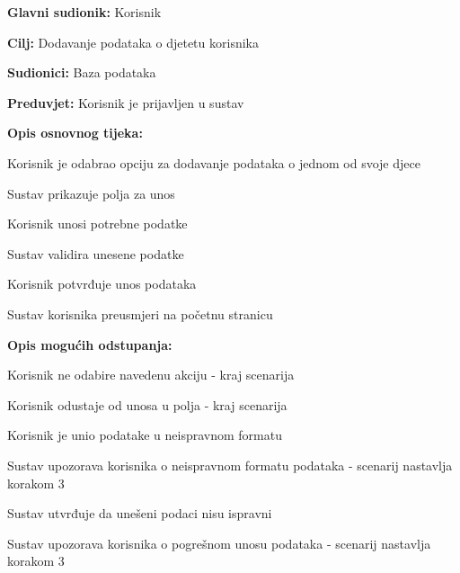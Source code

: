 					\eject

					\noindent {}
					\begin{packed_item}
	
						\item \textbf{Glavni sudionik: }Korisnik
						\item  \textbf{Cilj:} Dodavanje podataka o djetetu korisnika
						\item  \textbf{Sudionici:} Baza podataka
						\item  \textbf{Preduvjet:} Korisnik je prijavljen u sustav
						\item  \textbf{Opis osnovnog tijeka:}
						
						\item[] \begin{packed_enum}
							\item Korisnik je odabrao opciju za dodavanje podataka o jednom od svoje djece
							\item Sustav prikazuje polja za unos
							\item Korisnik unosi potrebne podatke
							\item Sustav validira unesene podatke
							\item Korisnik potvrđuje unos podataka
							\item Sustav korisnika preusmjeri na početnu stranicu
						\end{packed_enum}

						\item  \textbf{Opis mogućih odstupanja:}

						\item[] \begin{packed_item}
							\item[1.a] Korisnik ne odabire navedenu akciju - kraj scenarija
							\item[3.a] Korisnik odustaje od unosa u polja - kraj scenarija
							\item[4.a] Korisnik je unio podatake u neispravnom formatu
							\item[] \begin{packed_enum}
								\item Sustav upozorava korisnika o neispravnom formatu podataka - scenarij nastavlja korakom 3 
							\end{packed_enum}	
							\item[6.a] Sustav utvrđuje da unešeni podaci nisu ispravni
							\item[] \begin{packed_enum}
								\item Sustav upozorava korisnika o pogrešnom unosu podataka - scenarij nastavlja korakom 3 
							\end{packed_enum}					
						\end{packed_item}
					\end{packed_item}	

